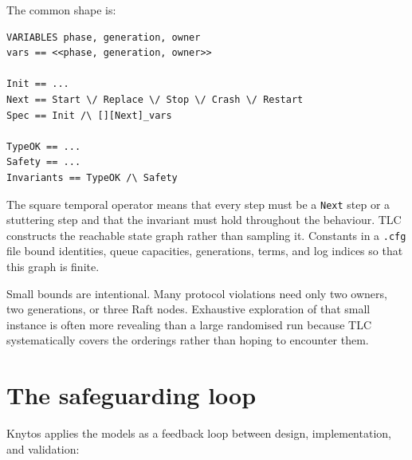 The common shape is:

\begin{verbatim}
VARIABLES phase, generation, owner
vars == <<phase, generation, owner>>

Init == ...
Next == Start \/ Replace \/ Stop \/ Crash \/ Restart
Spec == Init /\ [][Next]_vars

TypeOK == ...
Safety == ...
Invariants == TypeOK /\ Safety
\end{verbatim}

The square temporal operator means that every step must be a \texttt{Next}
step or a stuttering step and that the invariant must hold throughout the
behaviour. TLC constructs the reachable state graph rather than sampling it.
Constants in a \texttt{.cfg} file bound identities, queue capacities,
generations, terms, and log indices so that this graph is finite.

Small bounds are intentional. Many protocol violations need only two owners,
two generations, or three Raft nodes. Exhaustive exploration of that small
instance is often more revealing than a large randomised run because TLC
systematically covers the orderings rather than hoping to encounter them.

\section{The safeguarding loop}

Knytos applies the models as a feedback loop between design,
implementation, and validation:

